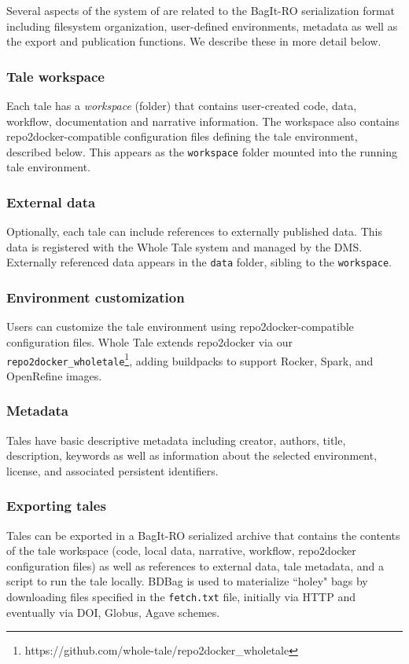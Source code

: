 \documentclass[conference]{IEEEtran}
\begin{document}
Several aspects of the system of are related to the BagIt-RO serialization format including filesystem organization, user-defined environments, metadata as well as the export and publication functions. We describe these in more detail below.

\subsubsection{Tale workspace}
Each tale has a \emph{workspace} (folder) that contains user-created code, data, workflow, documentation and narrative information. The workspace also contains repo2docker-compatible configuration files defining the tale environment, described below. This appears as the \texttt{workspace} folder mounted into the running tale environment.

\subsubsection{External data}
Optionally, each tale can include references to externally published data.  This data is registered with the Whole Tale system and managed by the DMS.  Externally referenced data appears in the \texttt{data} folder, sibling to the \texttt{workspace}.

\subsubsection{Environment customization}
Users can customize the tale environment using repo2docker-compatible configuration files.  Whole Tale extends repo2docker via our \texttt{repo2docker\_wholetale}\footnote{https://github.com/whole-tale/repo2docker\_wholetale}, adding buildpacks to support Rocker, Spark, and OpenRefine images. 

\subsubsection{Metadata}

Tales have basic descriptive metadata including creator, authors, title, description, keywords as well as information about the selected environment, license, and associated persistent identifiers.

\subsubsection{Exporting tales}

Tales can be exported in a BagIt-RO serialized archive that contains the contents of the tale workspace (code, local data, narrative, workflow, repo2docker configuration files) as well as references to external data, tale metadata, and a script to run the tale locally. BDBag \cite{chard2016} is used to materialize ``holey" bags by downloading files specified in the \texttt{fetch.txt} file, initially via HTTP and eventually via DOI, Globus, Agave schemes.
\end{document}
